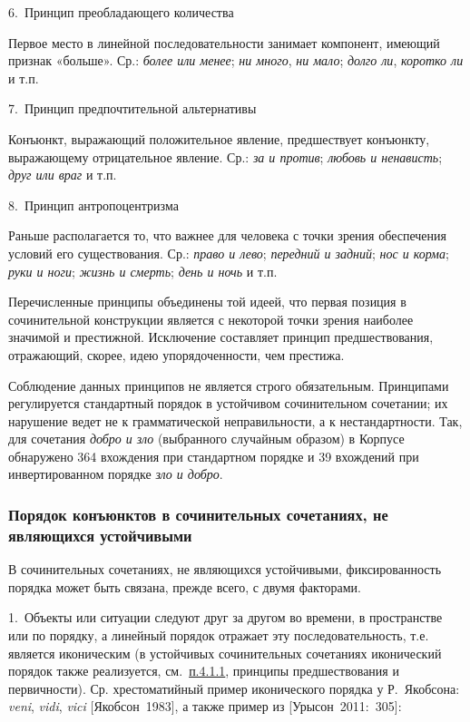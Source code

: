 6.~Принцип преобладающего количества

Первое место в линейной последовательности занимает компонент, имеющий
признак «больше». Ср.: \textit{более или менее}; \textit{ни много}, \textit{ни
  мало}; \textit{долго ли}, \textit{коротко ли} и т.п.

7.~Принцип предпочтительной альтернативы

Конъюнкт, выражающий положительное явление, предшествует конъюнкту,
выражающему отрицательное явление. Ср.: \textit{за и против}; \textit{любовь
  и ненависть}; \textit{друг или враг} и т.п.

8.~Принцип антропоцентризма

Раньше располагается то, что важнее для человека с точки зрения
обеспечения условий его существования. Ср.: \textit{право и лево};
\textit{передний и задний}; \textit{нос и корма}; \textit{руки и ноги};
\textit{жизнь и смерть}; \textit{день и ночь} и т.п.

Перечисленные принципы объединены той идеей, что первая позиция в
сочинительной конструкции является с некоторой точки зрения наиболее
значимой и престижной. Исключение составляет принцип предшествования,
отражающий, скорее, идею упорядоченности, чем престижа.

Соблюдение данных принципов не является строго обязательным. Принципами
регулируется стандартный порядок в устойчивом сочинительном сочетании;
их нарушение ведет не к грамматической неправильности, а к
нестандартности. Так, для сочетания \textit{добро и зло} (выбранного
случайным образом) в Корпусе обнаружено 364 вхождения при стандартном
порядке и 39 вхождений при инвертированном порядке \textit{зло и добро}.

\subsubsection{Порядок конъюнктов в сочинительных сочетаниях, не
  являющихся
  устойчивыми}\label{ux43fux43eux440ux44fux434ux43eux43a-ux43aux43eux43dux44aux44eux43dux43aux442ux43eux432-ux432-ux441ux43eux447ux438ux43dux438ux442ux435ux43bux44cux43dux44bux445-ux441ux43eux447ux435ux442ux430ux43dux438ux44fux445-ux43dux435-ux44fux432ux43bux44fux44eux449ux438ux445ux441ux44f-ux443ux441ux442ux43eux439ux447ux438ux432ux44bux43cux438}

В сочинительных сочетаниях, не являющихся устойчивыми, фиксированность
порядка может быть связана, прежде всего, с двумя факторами.

1.~Объекты или ситуации следуют друг за другом во времени, в
пространстве или по порядку, а линейный порядок отражает эту
последовательность, т.е. является иконическим (в устойчивых
сочинительных сочетаниях иконический порядок также реализуется,
см.~\underline{п.4.1.1}, принципы предшествования и первичности). Ср.
хрестоматийный пример иконического порядка у Р.~Якобсона: \textit{veni},
\textit{vidi}, \textit{vici} {[}Якобсон~1983{]}, а также пример из
{[}Урысон~2011:~305{]}:

